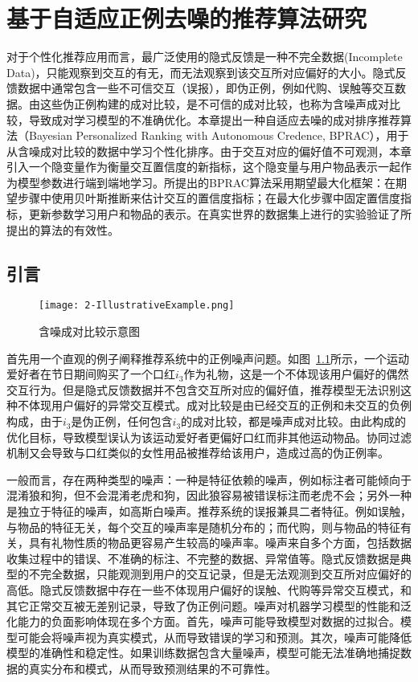 

\chapter{基于自适应正例去噪的推荐算法研究}
\label{cha:2}
对于个性化推荐应用而言，最广泛使用的隐式反馈是一种不完全数据(Incomplete Data)，只能观察到交互的有无，而无法观察到该交互所对应偏好的大小。隐式反馈数据中通常包含一些不可信交互（误报），即伪正例，例如代购、误触等交互数据。由这些伪正例构建的成对比较，是不可信的成对比较，也称为含噪声成对比较，导致成对学习模型的不准确优化。本章提出一种自适应去噪的成对排序推荐算法（Bayesian Personalized Ranking with Autonomous Credence, BPRAC），用于从含噪成对比较的数据中学习个性化排序。由于交互对应的偏好值不可观测，本章引入一个隐变量作为衡量交互置信度的新指标，这个隐变量与用户物品表示一起作为模型参数进行端到端地学习。所提出的BPRAC算法采用期望最大化框架：在期望步骤中使用贝叶斯推断来估计交互的置信度指标；在最大化步骤中固定置信度指标，更新参数学习用户和物品的表示。在真实世界的数据集上进行的实验验证了所提出的算法的有效性。

\section{引言}
\begin{figure}[!htbp]
	\centering
	\texttt{[image: 2-IllustrativeExample.png]}
	\caption{含噪成对比较示意图}
	\label{Fig2-1}
\end{figure}

首先用一个直观的例子阐释推荐系统中的正例噪声问题。如图~\ref{Fig2-1}所示，一个运动爱好者在节日期间购买了一个口红$i_3$作为礼物，这是一个不体现该用户偏好的偶然交互行为。但是隐式反馈数据并不包含交互所对应的偏好值，推荐模型无法识别这种不体现用户偏好的异常交互模式。成对比较是由已经交互的正例和未交互的负例构成，由于$i_3$是伪正例，任何包含$i_3$的成对比较，都是噪声成对比较。由此构成的优化目标，导致模型误认为该运动爱好者更偏好口红而非其他运动物品。协同过滤机制又会导致与口红类似的女性用品被推荐给该用户，造成过高的伪正例率。

一般而言，存在两种类型的噪声：一种是特征依赖的噪声\cite{Menon:2018:ML}，例如标注者可能倾向于混淆狼和狗，但不会混淆老虎和狗，因此狼容易被错误标注而老虎不会；另外一种是独立于特征的噪声\cite{patrini:2017:CVPR}，如高斯白噪声。推荐系统的误报兼具二者特征。例如误触，与物品的特征无关，每个交互的噪声率是随机分布的；而代购，则与物品的特征有关，具有礼物性质的物品更容易产生较高的噪声率。噪声来自多个方面，包括数据收集过程中的错误、不准确的标注、不完整的数据、异常值等。隐式反馈数据是典型的不完全数据，只能观测到用户的交互记录，但是无法观测到交互所对应偏好的高低。隐式反馈数据中存在一些不体现用户偏好的误触、代购等异常交互模式，和其它正常交互被无差别记录，导致了伪正例问题。噪声对机器学习模型的性能和泛化能力的负面影响体现在多个方面。首先，噪声可能导致模型对数据的过拟合。模型可能会将噪声视为真实模式，从而导致错误的学习和预测。其次，噪声可能降低模型的准确性和稳定性。如果训练数据包含大量噪声，模型可能无法准确地捕捉数据的真实分布和模式，从而导致预测结果的不可靠性。

